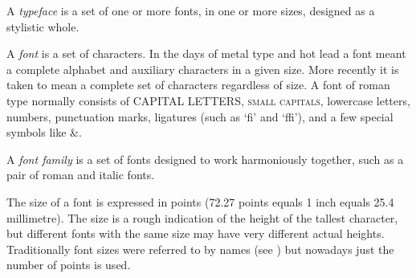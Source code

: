 \documentclass[10pt,letterpaper,extrafontsizes]{memoir}
\begin{document}
   A \emph{typeface} is a set of one or more fonts, in one
or more sizes, designed as a stylistic whole. 

   A \emph{font} is a set of characters. In the days of 
metal type and hot lead a font meant a complete alphabet and auxiliary
characters in a given size. More recently it is taken to mean a complete
set of characters regardless of size. A font of roman type normally
consists of CAPITAL LETTERS, \textsc{small capitals}, lowercase letters,
numbers, punctuation marks, ligatures (such as `fi' and `ffi'), and a
few special symbols like \&.

   A \emph{font family} is a set of fonts designed to
work harmoniously together, such as a pair of roman and italic fonts.

   The size of a font is expressed in points 
(72.27 points equals 1 inch
equals 25.4 millimetre). The size is a rough indication of the height
of the tallest character, but different fonts with the same size may have
very different actual heights. Traditionally font sizes were referred to
by names (see ) but nowadays just the number of points 
is used.
\end{document}
